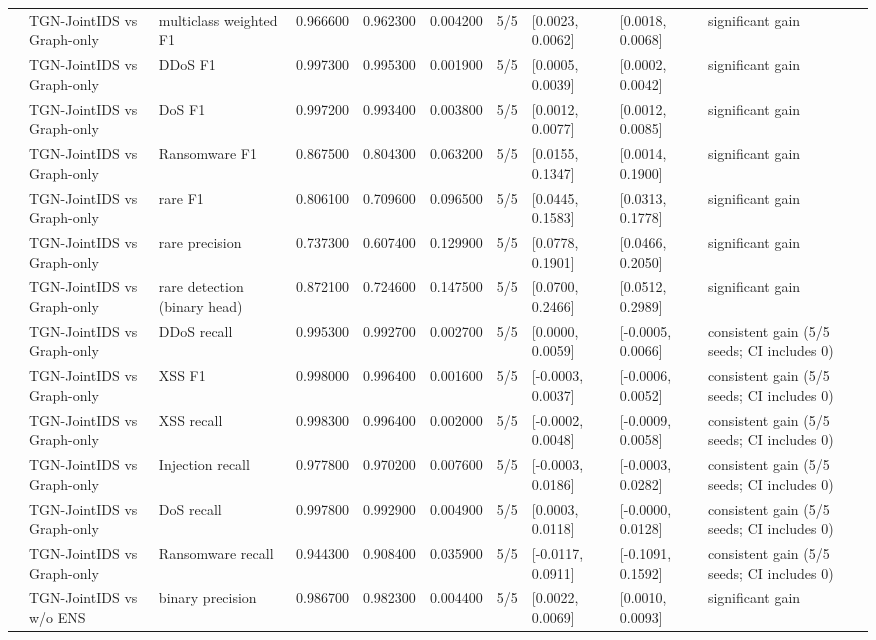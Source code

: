 \begin{table}
\begin{tabular}{lllrrrllll}
 & TGN-JointIDS vs Graph-only & multiclass weighted F1 & 0.966600 & 0.962300 & 0.004200 & 5/5 & [0.0023, 0.0062] & [0.0018, 0.0068] & significant gain \\
 & TGN-JointIDS vs Graph-only & DDoS F1 & 0.997300 & 0.995300 & 0.001900 & 5/5 & [0.0005, 0.0039] & [0.0002, 0.0042] & significant gain \\
 & TGN-JointIDS vs Graph-only & DoS F1 & 0.997200 & 0.993400 & 0.003800 & 5/5 & [0.0012, 0.0077] & [0.0012, 0.0085] & significant gain \\
 & TGN-JointIDS vs Graph-only & Ransomware F1 & 0.867500 & 0.804300 & 0.063200 & 5/5 & [0.0155, 0.1347] & [0.0014, 0.1900] & significant gain \\
 & TGN-JointIDS vs Graph-only & rare F1 & 0.806100 & 0.709600 & 0.096500 & 5/5 & [0.0445, 0.1583] & [0.0313, 0.1778] & significant gain \\
 & TGN-JointIDS vs Graph-only & rare precision & 0.737300 & 0.607400 & 0.129900 & 5/5 & [0.0778, 0.1901] & [0.0466, 0.2050] & significant gain \\
 & TGN-JointIDS vs Graph-only & rare detection (binary head) & 0.872100 & 0.724600 & 0.147500 & 5/5 & [0.0700, 0.2466] & [0.0512, 0.2989] & significant gain \\
 & TGN-JointIDS vs Graph-only & DDoS recall & 0.995300 & 0.992700 & 0.002700 & 5/5 & [0.0000, 0.0059] & [-0.0005, 0.0066] & consistent gain (5/5 seeds; CI includes 0) \\
 & TGN-JointIDS vs Graph-only & XSS F1 & 0.998000 & 0.996400 & 0.001600 & 5/5 & [-0.0003, 0.0037] & [-0.0006, 0.0052] & consistent gain (5/5 seeds; CI includes 0) \\
 & TGN-JointIDS vs Graph-only & XSS recall & 0.998300 & 0.996400 & 0.002000 & 5/5 & [-0.0002, 0.0048] & [-0.0009, 0.0058] & consistent gain (5/5 seeds; CI includes 0) \\
 & TGN-JointIDS vs Graph-only & Injection recall & 0.977800 & 0.970200 & 0.007600 & 5/5 & [-0.0003, 0.0186] & [-0.0003, 0.0282] & consistent gain (5/5 seeds; CI includes 0) \\
 & TGN-JointIDS vs Graph-only & DoS recall & 0.997800 & 0.992900 & 0.004900 & 5/5 & [0.0003, 0.0118] & [-0.0000, 0.0128] & consistent gain (5/5 seeds; CI includes 0) \\
 & TGN-JointIDS vs Graph-only & Ransomware recall & 0.944300 & 0.908400 & 0.035900 & 5/5 & [-0.0117, 0.0911] & [-0.1091, 0.1592] & consistent gain (5/5 seeds; CI includes 0) \\
 & TGN-JointIDS vs w/o ENS & binary precision & 0.986700 & 0.982300 & 0.004400 & 5/5 & [0.0022, 0.0069] & [0.0010, 0.0093] & significant gain \\

\end{tabular}
\end{table}
